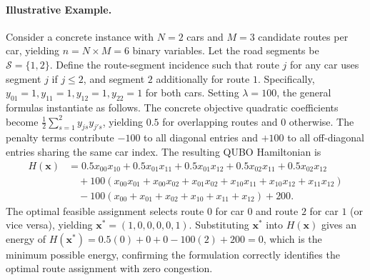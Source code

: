 \documentclass[12pt]{article}
\begin{document}
\paragraph{Illustrative Example.}
Consider a concrete instance with $N=2$ cars and $M=3$ candidate routes per car, yielding $n = N \times M = 6$ binary variables. Let the road segments be $\mathcal{S} = \{1, 2\}$. Define the route-segment incidence such that route $j$ for any car uses segment $j$ if $j \le 2$, and segment $2$ additionally for route $1$. Specifically, $y_{01}=1, y_{11}=1, y_{12}=1, y_{22}=1$ for both cars. Setting $\lambda = 100$, the general formulas instantiate as follows. The concrete objective quadratic coefficients become $\frac{1}{2} \sum_{s=1}^2 y_{js} y_{j's}$, yielding $0.5$ for overlapping routes and $0$ otherwise. The penalty terms contribute $-100$ to all diagonal entries and $+100$ to all off-diagonal entries sharing the same car index. The resulting QUBO Hamiltonian is
\begin{align}
H(\mathbf{x}) &= 0.5 x_{00}x_{10} + 0.5 x_{01}x_{11} + 0.5 x_{01}x_{12} + 0.5 x_{02}x_{11} + 0.5 x_{02}x_{12} \\
&\quad + 100(x_{00}x_{01} + x_{00}x_{02} + x_{01}x_{02} + x_{10}x_{11} + x_{10}x_{12} + x_{11}x_{12}) \\
&\quad - 100(x_{00} + x_{01} + x_{02} + x_{10} + x_{11} + x_{12}) + 200.
\end{align}
The optimal feasible assignment selects route $0$ for car $0$ and route $2$ for car $1$ (or vice versa), yielding $\mathbf{x}^* = (1,0,0,0,0,1)$. Substituting $\mathbf{x}^*$ into $H(\mathbf{x})$ gives an energy of $H(\mathbf{x}^*) = 0.5(0) + 0 + 0 - 100(2) + 200 = 0$, which is the minimum possible energy, confirming the formulation correctly identifies the optimal route assignment with zero congestion.
\end{document}

